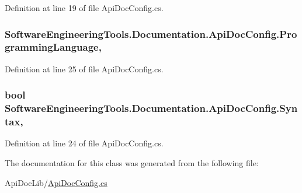 Definition at line 19 of file Api\+Doc\+Config.\+cs.

\hypertarget{class_software_engineering_tools_1_1_documentation_1_1_api_doc_config_a3f77c32b76d1e399d84887306bc082ca}{
\subsubsection[{Programming\+Language}]{ Software\+Engineering\+Tools.\+Documentation.\+Api\+Doc\+Config.\+Programming\+Language\hspace{0.3cm}{\ttfamily [get]}, {\ttfamily [set]}}}\label{class_software_engineering_tools_1_1_documentation_1_1_api_doc_config_a3f77c32b76d1e399d84887306bc082ca}


Definition at line 25 of file Api\+Doc\+Config.\+cs.

\hypertarget{class_software_engineering_tools_1_1_documentation_1_1_api_doc_config_ae804e23f5afc363b3f884f0b97be574c}{
\subsubsection[{Syntax}]{\setlength{\rightskip}{0pt plus 5cm}bool Software\+Engineering\+Tools.\+Documentation.\+Api\+Doc\+Config.\+Syntax\hspace{0.3cm}{\ttfamily [get]}, {\ttfamily [set]}}}\label{class_software_engineering_tools_1_1_documentation_1_1_api_doc_config_ae804e23f5afc363b3f884f0b97be574c}


Definition at line 24 of file Api\+Doc\+Config.\+cs.



The documentation for this class was generated from the following file\+:\begin{DoxyCompactItemize}
\item 
Api\+Doc\+Lib/\hyperlink{_api_doc_config_8cs}{Api\+Doc\+Config.\+cs}\end{DoxyCompactItemize}
